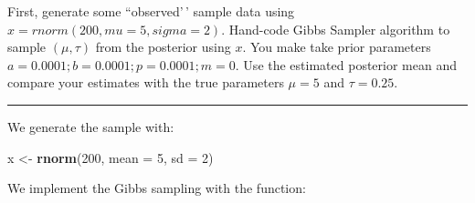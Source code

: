 \documentclass[
  11pt,
]{paper}
\newenvironment{Shaded}{\begin{snugshade}}{\end{snugshade}}
\newcommand{\AttributeTok}[1]{\textcolor[rgb]{0.13,0.29,0.53}{#1}}
\newcommand{\DecValTok}[1]{\textcolor[rgb]{0.00,0.00,0.81}{#1}}
\newcommand{\FunctionTok}[1]{\textcolor[rgb]{0.13,0.29,0.53}{\textbf{#1}}}
\newcommand{\NormalTok}[1]{#1}
\newcommand{\OtherTok}[1]{\textcolor[rgb]{0.56,0.35,0.01}{#1}}
\begin{document}
First, generate some ``observed'\,' sample data using
\(x = rnorm(200,mu=5,sigma=2)\). Hand-code Gibbs Sampler algorithm to
sample \((\mu,\tau)\) from the posterior using \(x\). You make take
prior parameters \(a = 0.0001; b = 0.0001; p = 0.0001; m = 0\). Use the
estimated posterior mean and compare your estimates with the true
parameters \(\mu = 5\) and \(\tau = 0.25\).

\begin{center}\rule{0.5\linewidth}{0.5pt}\end{center}

We generate the sample with:

\begin{Shaded}
\begin{Highlighting}[]
\NormalTok{x }\OtherTok{\textless{}{-}} \FunctionTok{rnorm}\NormalTok{(}\DecValTok{200}\NormalTok{, }\AttributeTok{mean =} \DecValTok{5}\NormalTok{, }\AttributeTok{sd =} \DecValTok{2}\NormalTok{)}
\end{Highlighting}
\end{Shaded}

We implement the Gibbs sampling with the function:
\end{document}
